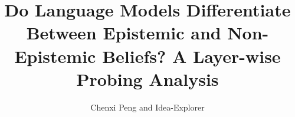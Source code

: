 \documentclass{article}
\title{Do Language Models Differentiate Between Epistemic and Non-Epistemic Beliefs? A Layer-wise Probing Analysis}
\author{Chenxi Peng and Idea-Explorer}
\begin{document}
\maketitle

\begin{abstract}

\end{abstract}










\end{document}
